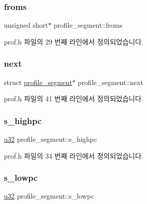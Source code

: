 \subsubsection{\texorpdfstring{froms}{froms}}
{\footnotesize\ttfamily unsigned short$\ast$ profile\+\_\+segment\+::froms}



prof.\+h 파일의 29 번째 라인에서 정의되었습니다.

\mbox{\label{structprofile__segment_a105e1835554471470a91583c6da7860e}} 
\subsubsection{\texorpdfstring{next}{next}}
{\footnotesize\ttfamily struct \mbox{\hyperlink{structprofile__segment}{profile\+\_\+segment}}$\ast$ profile\+\_\+segment\+::next}



prof.\+h 파일의 41 번째 라인에서 정의되었습니다.

\mbox{\label{structprofile__segment_a7f09373641edd894f53bc8eb0133698e}} 
\subsubsection{\texorpdfstring{s\+\_\+highpc}{s\_highpc}}
{\footnotesize\ttfamily \mbox{\hyperlink{_system_8h_a10e94b422ef0c20dcdec20d31a1f5049}{u32}} profile\+\_\+segment\+::s\+\_\+highpc}



prof.\+h 파일의 34 번째 라인에서 정의되었습니다.

\mbox{\label{structprofile__segment_aa8ee9d63ea20e39b677163d2de599c0a}} 
\subsubsection{\texorpdfstring{s\+\_\+lowpc}{s\_lowpc}}
{\footnotesize\ttfamily \mbox{\hyperlink{_system_8h_a10e94b422ef0c20dcdec20d31a1f5049}{u32}} profile\+\_\+segment\+::s\+\_\+lowpc}



